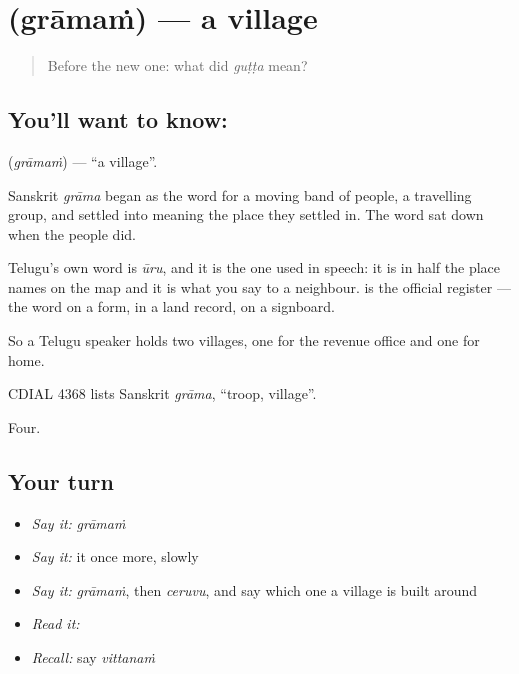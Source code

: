 \section[\texorpdfstring{\te{గ్రామం} (grāmaṁ)}{గ్రామం (grāmaṁ)}]{ (grāmaṁ) — a village}

\label{lesson:TE-C55-village}



\begin{quote}
Before the new one: what did \emph{guṭṭa} mean?
\end{quote}

\subsection*{You'll want to know: }
\textbf{} (\emph{grāmaṁ}) — \textquotedblleft{}a village\textquotedblright{}.

Sanskrit \emph{grāma} began as the word for a moving band of people, a travelling group, and settled into meaning the place they settled in. The word sat down when the people did.

Telugu's own word is \emph{ūru}, and it is the one used in speech: it is in half the place names on the map and it is what you say to a neighbour.  is the official register — the word on a form, in a land record, on a signboard.

So a Telugu speaker holds two villages, one for the revenue office and one for home.

CDIAL 4368 lists Sanskrit \emph{grāma}, \textquotedblleft{}troop, village\textquotedblright{}.

\begin{grammarlens}[title={What you've built}]
Four.
\end{grammarlens}

\subsection*{Your turn}
\begin{itemize}
\raggedright
  \item \emph{Say it:} \emph{grāmaṁ}
  \item \emph{Say it:} it once more, slowly
  \item \emph{Say it:} \emph{grāmaṁ}, then \emph{ceruvu}, and say which one a village is built around
  \item \emph{Read it:} \textbf{}
  \item \emph{Recall:} say \emph{vittanaṁ}
\end{itemize}

